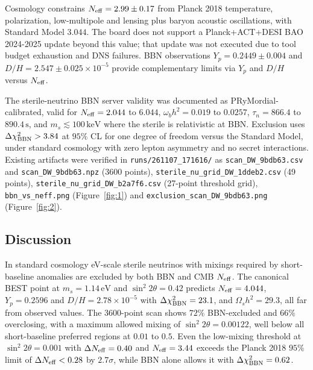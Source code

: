\documentclass[11pt,a4paper]{article}
\begin{document}
Cosmology constrains $N_{\rm eff} = 2.99 \pm 0.17$ from Planck 2018 temperature, polarization, low-multipole and lensing plus baryon acoustic oscillations, with Standard Model $3.044$. The board does not support a Planck+ACT+DESI BAO 2024-2025 update beyond this value; that update was not executed due to tool budget exhaustion and DNS failures. BBN observations $Y_p = 0.2449 \pm 0.004$ and $D/H = 2.547 \pm 0.025 \times 10^{-5}$ provide complementary limits via $Y_p$ and $D/H$ versus $N_{\rm eff}$.

The sterile-neutrino BBN server validity was documented as PRyMordial-calibrated, valid for $N_{\rm eff} = 2.044$ to $6.044$, $\omega_b h^2 = 0.019$ to $0.0257$, $\tau_n = 866.4$ to $890.4\,\mathrm{s}$, and $m_s \lesssim 100\,\mathrm{keV}$ where the sterile is relativistic at BBN. Exclusion uses $\Delta\chi^2_{\rm BBN} > 3.84$ at $95\%$ CL for one degree of freedom versus the Standard Model, under standard cosmology with zero lepton asymmetry and no secret interactions. Existing artifacts were verified in \texttt{runs/\allowbreak{}261107\_\allowbreak{}171616/\allowbreak{}} as \texttt{scan\_\allowbreak{}DW\_\allowbreak{}9bdb63.csv} and \texttt{scan\_\allowbreak{}DW\_\allowbreak{}9bdb63.npz} (3600 points), \texttt{sterile\_\allowbreak{}nu\_\allowbreak{}grid\_\allowbreak{}DW\_\allowbreak{}1ddeb2.csv} (49 points), \texttt{sterile\_\allowbreak{}nu\_\allowbreak{}grid\_\allowbreak{}DW\_\allowbreak{}b2a7f6.csv} (27-point threshold grid), \texttt{bbn\_\allowbreak{}vs\_\allowbreak{}neff.png} (Figure~\ref{fig:1}) and \texttt{exclusion\_\allowbreak{}scan\_\allowbreak{}DW\_\allowbreak{}9bdb63.png} (Figure~\ref{fig:2}).

\subsection{Discussion}
In standard cosmology eV-scale sterile neutrinos with mixings required by short-baseline anomalies are excluded by both BBN and CMB $N_{\rm eff}$. The canonical BEST point at $m_s = 1.14\,\mathrm{eV}$ and $\sin^2 2\theta = 0.42$ predicts $N_{\rm eff} = 4.044$, $Y_p = 0.2596$ and $D/H = 2.78 \times 10^{-5}$ with $\Delta\chi^2_{\rm BBN} = 23.1$, and $\Omega_s h^2 = 29.3$, all far from observed values. The 3600-point scan shows $72\%$ BBN-excluded and $66\%$ overclosing, with a maximum allowed mixing of $\sin^2 2\theta = 0.00122$, well below all short-baseline preferred regions at $0.01$ to $0.5$. Even the low-mixing threshold at $\sin^2 2\theta = 0.001$ with $\Delta N_{\rm eff} = 0.40$ and $N_{\rm eff} = 3.44$ exceeds the Planck 2018 $95\%$ limit of $\Delta N_{\rm eff} < 0.28$ by $2.7\sigma$, while BBN alone allows it with $\Delta\chi^2_{\rm BBN} = 0.62$.
\end{document}
